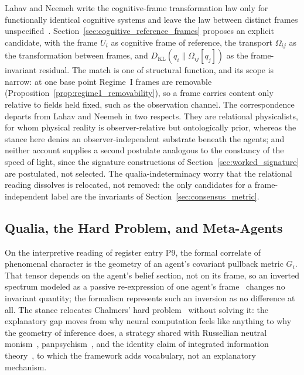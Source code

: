 Lahav and Neemeh write the cognitive-frame transformation law only for functionally identical cognitive systems and leave the law between distinct frames unspecified~\cite{LahavNeemeh2022, LahavNeemeh2025}. Section~\ref{sec:cognitive_reference_frames} proposes an explicit candidate, with the frame $U_i$ as cognitive frame of reference, the transport $\Omega_{ij}$ as the transformation between frames, and $D_{\mathrm{KL}}(q_i \| \Omega_{ij}[q_j])$ as the frame-invariant residual. The match is one of structural function, and its scope is narrow: at one base point Regime~I frames are removable (Proposition~\ref{prop:regime1_removability}), so a frame carries content only relative to fields held fixed, such as the observation channel. The correspondence departs from Lahav and Neemeh in two respects. They are relational physicalists, for whom physical reality is observer-relative but ontologically prior, whereas the stance here denies an observer-independent substrate beneath the agents; and neither account supplies a second postulate analogous to the constancy of the speed of light, since the signature constructions of Section~\ref{sec:worked_signature} are postulated, not selected. The qualia-indeterminacy worry that the relational reading dissolves is relocated, not removed: the only candidates for a frame-independent label are the invariants of Section~\ref{sec:consensus_metric}.

\subsection{Qualia, the Hard Problem, and Meta-Agents}

On the interpretive reading of register entry P9, the formal correlate of phenomenal character is the geometry of an agent's covariant pullback metric $G_i$. That tensor depends on the agent's belief section, not on its frame, so an inverted spectrum modeled as a passive re-expression of one agent's frame~\cite{Shoemaker1982} changes no invariant quantity; the formalism represents such an inversion as no difference at all. The stance relocates Chalmers' hard problem~\cite{Chalmers1995, Chalmers1996} without solving it: the explanatory gap moves from why neural computation feels like anything to why the geometry of inference does, a strategy shared with Russellian neutral monism~\cite{Russell1927, Strawson2006}, panpsychism~\cite{Goff2017, Chalmers2013consciousness}, and the identity claim of integrated information theory~\cite{Tononi2008, Tononi2015}, to which the framework adds vocabulary, not an explanatory mechanism.

